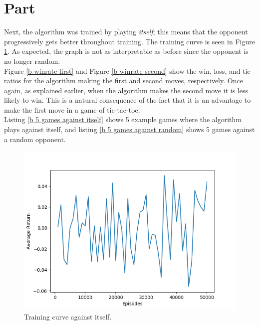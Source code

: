 \documentclass{article}
\newcommand{\enterproblemHeader}[1]{
}
\newcommand{\exitproblemHeader}[1]{
}
\newcounter{problem} %
\newcommand{\problemName}{}
\newenvironment{problem}[1][Part \theproblem]{ %
	\stepcounter{problem} %
	\renewcommand{\problemName}{#1} %
	\section{\problemName} %
	\enterproblemHeader{\problemName} %
}{
	\exitproblemHeader{\problemName} %
}
\begin{document}
\FloatBarrier
\begin{problem}
Next, the algorithm was trained by playing \textit{itself}; this means that the opponent progressively gets better throughout training. The training curve is seen in Figure \ref{b training curve}. As expected, the graph is not as interpretable as before since the opponent is no longer random.\\

Figure \ref{b winrate first} and Figure \ref{b winrate second} show the win, loss, and tie ratios for the algorithm making the first and second moves, respectively. Once again, as explained earlier, when the algorithm makes the second move it is less likely to win. This is a natural consequence of the fact that it is an advantage to make the first move in a game of tic-tac-toe.\\

Listing \ref{b 5 games against itself} shows 5 example games where the algorithm plays against itself, and listing \ref{b 5 games against random} shows 5 games against a random opponent.

\begin{figure}
		\includegraphics[width=\linewidth]{bonus_b_training.png}
		\caption{Training curve against itself.}
		\label{b training curve}
\end{figure}


\end{problem}
\end{document}
